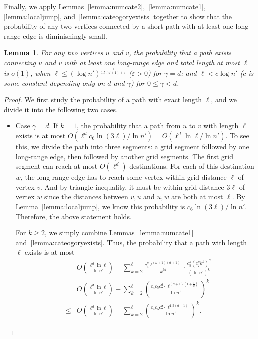 \documentclass[11pt]{article}
\newtheorem{lem}{Lemma}
\begin{document}
Finally, we apply Lemmas~\ref{lemma:numcate2},~\ref{lemma:numcate1},
	\ref{lemma:localjump}, and~\ref{lemma:cateogoryexists} together to show that
	the probability of any two vertices connected by a short path with
	at least one long-range edge is diminishingly small.
\begin{lem} \label{lemma:smallprob}
For any two vertices $u$ and $v$, the probability that a path exists connecting
	$u$ and $v$ with at least one long-range edge and
	total length at most $\ell$ is $o(1)$, 
	when $\ell\leq(\log n')^{\frac{1}{1.5(d+1)+\varepsilon}}$ ($\varepsilon>0$) 
	for $\gamma=d$; and $\ell<c \log n'$ 
	($c$ is some constant depending only on $d$ and $\gamma$) 
	for $0\leq\gamma<d$.
\end{lem}
\begin{proof}
We first study the probability of a path with exact length $\ell$,
	and we divide it into the following two cases.
\begin{itemize}
\item
Case $\gamma =d$.
If $k=1$, the probability that a path from $u$ to $v$
	with length $\ell$ exists is at 
	most $O(\ell^dc_6\ln(3\ell)/\ln n')=O(\ell^d\ln \ell/\ln n')$. 
To see this, we divide the path into three segments: 
	a grid segment followed by one long-range edge, then followed
	by another grid segments.
The first grid segment can reach at most $O(\ell^d)$ destinations.
For each of this destination $w$, the long-range edge has to reach
	some vertex within grid distance $\ell$ of vertex $v$.
And by triangle inequality, it must be within grid distance $3\ell$ of vertex $w$ since the distances between $v,u$ and $u,w$ are both at most $\ell$.  
By Lemma~\ref{lemma:localjump}, we know this probability is
	$c_6 \ln (3\ell) / \ln n'$.
Therefore, the above statement holds.

For $k\ge 2$, we simply combine 
	Lemmas~\ref{lemma:numcate1} and~\ref{lemma:cateogoryexists}.
Thus, the probability that a path with length $\ell$ exists is at most
\begin{eqnarray*}
&& O\left(\frac{\ell^d\ln \ell}{\ln n'}\right)+
	\sum_{k=2}^\ell\frac{c_4^k \ell^{(k+1)(d+1)}}{k^{kd}}\cdot
	\frac{c_5^k\left(c_7^kk^k\right)^d}{(\ln n')^k} \\
	&= &
	O\left(\frac{\ell^d\ln \ell}{\ln n'}\right)+
	\sum_{k=2}^\ell\left(\frac{c_4c_5c_7^d
		\cdot \ell^{(d+1)(1+\frac{1}{k})}}{\ln n'}\right)^k \\
 & \le &O\left(\frac{\ell^d\ln \ell}{\ln n'}\right)+
	\sum_{k=2}^\ell\left(\frac{c_4c_5c_7^d
		\cdot \ell^{1.5(d+1)}}{\ln n'}\right)^k .
\end{eqnarray*}


\end{itemize}
\end{proof}
\end{document}
